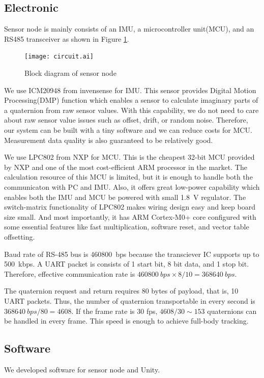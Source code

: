 \documentclass[journal]{IEEEtran}
\begin{document}
\subsection{Electronic}
Sensor node is mainly consists of an IMU, a microcontroller unit(MCU), and an RS485 transceiver as shown in Figure \ref{circuit}.
\begin{figure}[tb]
    \centering
    \texttt{[image: circuit.ai]}
    \caption{Block diagram of sensor node} \label{circuit}
\end{figure}
We use ICM20948 from invensense for IMU.
This sensor provides Digital Motion Processing(DMP) function which enables a sensor to calculate imaginary parts of a quaternion from raw sensor values.
With this capability, we do not need to care about raw sensor value issues such as offset, drift, or random noise.
Therefore, our system can be built with a tiny software and we can reduce costs for MCU.
Measurement data quality is also guaranteed to be relatively good.

We use LPC802 from NXP for MCU.
This is the cheapest 32-bit MCU provided by NXP and one of the most cost-efficient ARM processor in the market.
The calculation resource of this MCU is limited, but it is enough to handle both the communicaton with PC and IMU.
Also, it offers great low-power capability which enables both the IMU and MCU be powered with small \SI{1.8}{\V} regulator.
The switch-matrix functionality of LPC802 makes wiring design easy and keep board size small.
And most importantly, it has ARM Cortex-M0+ core configured with some essential features like fast multiplication, software reset, and vector table offsetting.

Baud rate of RS-485 bus is \SI{460800}{bps} because the transciever IC supports up to \SI{500}{kbps}.
A UART packet is consists of 1 start bit, 8 bit data, and 1 stop bit.
Therefore, effective communication rate is \(\SI{460800}{bps} \times 8/10 = \SI{368640}{bps}\).

The quaternion request and return requires 80 bytes of payload, that is, 10 UART packets.
Thus, the number of quaternion transportable in every second is \(\SI{368640}{bps} / 80 = \num{4608}\).
If the frame rate is 30 fps, \(\num{4608} / 30 \sim 153\) quaternions can be handled in every frame.
This speed is enough to achieve full-body tracking.

\subsection{Software}
We developed software for sensor node and Unity.
\end{document}
